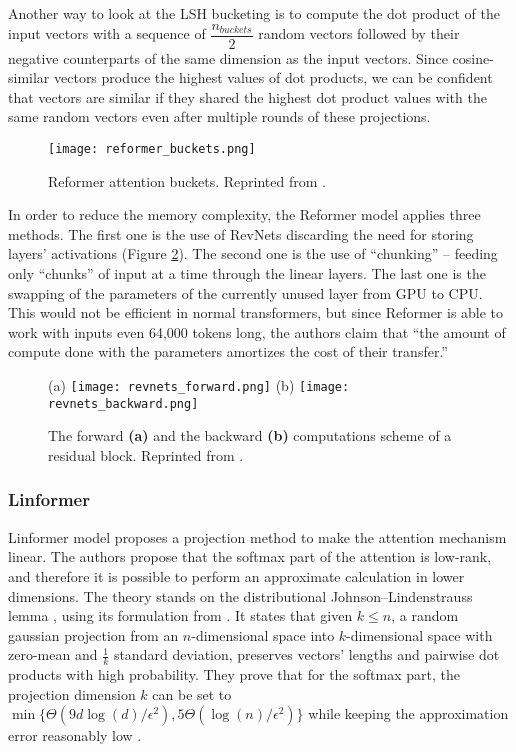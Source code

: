 Another way to look at the LSH bucketing is to compute the dot product of the input vectors with a sequence of $\dfrac{n_{buckets}}{2}$ random vectors followed by their negative counterparts of the same dimension as the input vectors.
Since cosine-similar vectors produce the highest values of dot products, we can be confident that vectors are similar if they shared the highest dot product values with the same random vectors even after multiple rounds of these projections.

\begin{figure}[!htb]
        \centering
        \texttt{[image: reformer\_buckets.png]}
        \caption[Reformer Attention Visualization]{Reformer attention buckets. Reprinted from \citep{reformer}.}
        \label{fig:reformer_buckets}
\end{figure}

In order to reduce the memory complexity, the Reformer model applies three methods.
The first one is the use of RevNets \citep{revnets} discarding the need for storing layers' activations (Figure \ref{fig:revnets}). The second one is the use of ``chunking'' -- feeding only ``chunks'' of input at a time through the linear layers.
The last one is the swapping of the parameters of the currently unused layer from GPU to CPU. This would not be efficient in normal transformers, but since Reformer is able to work with inputs even 64,000 tokens long, the authors claim that ``the amount of compute done with the parameters amortizes the cost of their transfer.''

\begin{figure}[!htb]
        \centering
        (a)
        \texttt{[image: revnets\_forward.png]}
        (b)
        \texttt{[image: revnets\_backward.png]}
        \caption[RevNet Scheme]{The forward \textbf{(a)} and the backward \textbf{(b)} computations scheme of a residual block. Reprinted from \citep{revnets}.}
        \label{fig:revnets}
\end{figure}

\subsubsection{Linformer}

Linformer model \citep{linformer} proposes a projection method to make the attention mechanism linear.
The authors propose that the softmax part of the attention is low-rank, and therefore it is possible to perform an approximate calculation in lower dimensions. The theory stands on the distributional
Johnson–Lindenstrauss lemma \citep{JL-lemma}, using its formulation from \citep{JL-formulation}. 
It states that given $k\leq n$, a random gaussian projection from an $n$-dimensional space into $k$-dimensional space with zero-mean and $\frac{1}{k}$ standard deviation, preserves vectors' lengths and pairwise dot products with high probability.
They prove that for the softmax part, the projection dimension $k$ can be set to $\min\{\Theta(9d\log(d)/\epsilon^2),5\Theta(\log(n)/\epsilon^2)\}$ while keeping the approximation error reasonably low \citep[Theorem 2]{linformer}.

